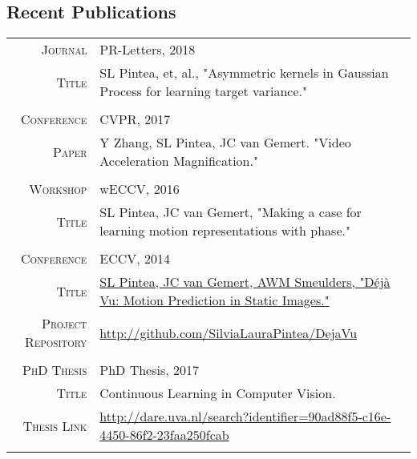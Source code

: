 \documentclass[a4paper, oneside, final]{scrartcl}
\newcommand{\gray}{\rowcolor[gray]{.90}}
\begin{document}
\begin{center}
		\section{Recent Publications}
		\begin{tabular}{r@{\hskip 0.3in}p{11.3cm}}
			\gray \textsc{Journal}    & PR-Letters, 2018\\ 
					\textsc{Title}	  & SL Pintea, et, al., "Asymmetric kernels in Gaussian Process for learning target variance."\\
			\multicolumn{2}{c}{}\\
			\gray \textsc{Conference} & CVPR, 2017\\
			\textsc{Paper}			& Y Zhang, SL Pintea, JC van Gemert. "Video Acceleration Magnification."\\ 
			\multicolumn{2}{c}{}\\
			\gray \textsc{Workshop} & wECCV, 2016\\
			\textsc{Title}			& SL Pintea, JC van Gemert, "Making a case for learning motion representations with phase."\\ 
			\multicolumn{2}{c}{}\\
			\gray \textsc{Conference}   & ECCV, 2014\\
				\textsc{Title}			& \href{https://staff.fnwi.uva.nl/s.l.pintea/dejavu/}{SL Pintea, JC van Gemert, AWM Smeulders, "D\'{e}j\`{a} Vu: Motion Prediction in Static Images."}\\	
			\textsc{Project Repository}  & \small\href{http://github.com/SilviaLauraPintea/DejaVu}
				{http://github.com/SilviaLauraPintea/DejaVu}\\ 
			\multicolumn{2}{c}{}\\
			\gray \textsc{PhD Thesis} & PhD Thesis, 2017\\
			\textsc{Title}			  & Continuous Learning in Computer Vision.\\ 
			\textsc{Thesis Link}      & \small\href{http://dare.uva.nl/search?identifier=90ad88f5-c16e-4450-86f2-23faa250fcab}
					{http://dare.uva.nl/search?identifier=90ad88f5-c16e-4450-86f2-23faa250fcab}\\
			\multicolumn{2}{c}{}\\
		\end{tabular}

\end{center}
\end{document}
